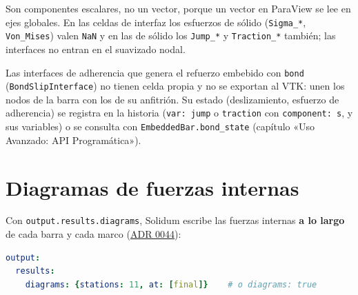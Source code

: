 \documentclass[11pt,oneside]{report}
\begin{document}
Son componentes escalares, no un vector, porque un vector en ParaView se lee en ejes globales. En las celdas de interfaz los esfuerzos de sólido (\texttt{Sigma\_*}, \texttt{Von\_Mises}) valen \texttt{NaN} y en las de sólido los \texttt{Jump\_*} y \texttt{Traction\_*} también; las interfaces no entran en el suavizado nodal.

Las interfaces de adherencia que genera el refuerzo embebido con \texttt{bond} (\texttt{BondSlipInterface}) no tienen celda propia y no se exportan al VTK: unen los nodos de la barra con los de su anfitrión. Su estado (deslizamiento, esfuerzo de adherencia) se registra en la historia (\texttt{var: jump} o \texttt{traction} con \texttt{component: s}, y sus variables) o se consulta con \texttt{EmbeddedBar.\allowbreak{}bond\_\allowbreak{}state} (capítulo «Uso Avanzado: API Programática»).

\section{Diagramas de fuerzas internas}

Con \texttt{output.\allowbreak{}results.\allowbreak{}diagrams}, Solidum escribe las fuerzas internas \textbf{a lo largo} de cada barra y cada marco (\href{https://github.com/jretamav/solidum-fem/blob/main/docs/adr/0044-cargas-de-linea-y-diagramas-de-fuerzas-internas.md}{ADR 0044}):

\begin{lstlisting}[language=yaml]
output:
  results:
    diagrams: {stations: 11, at: [final]}    # o diagrams: true

\end{lstlisting}
\end{document}
